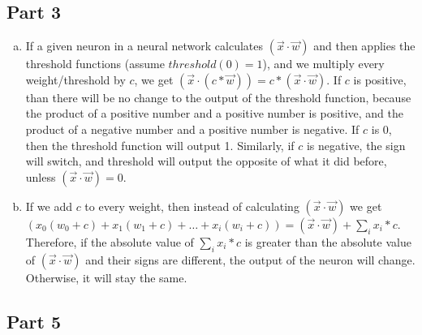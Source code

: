 \documentclass[11pt]{article}
\begin{document}
\subsection*{Part 3}
\begin{enumerate}[a.]
\item If a given neuron in a neural network calculates $(\vec{x} \cdot \vec{w})$ and then applies the threshold functions (assume $threshold(0) =  1$), and we multiply every weight/threshold by $c$, we get  $(\vec{x} \cdot (c * \vec{w})) =  c*(\vec{x} \cdot \vec{w})$. If $c$ is positive, than there will be no change to the output of the threshold function, because the product of a positive number and a positive number is positive, and the product of a negative number and a positive number is negative. If $c$ is 0, then the threshold function will output 1. Similarly, if $c$ is negative, the sign will switch, and threshold will output the opposite of what it did before, unless $(\vec{x} \cdot \vec{w}) = 0$.
\item If we add $c$ to every weight, then instead of calculating $(\vec{x} \cdot \vec{w})$ we get $(x_{0}(w_{0} + c) + x_{1}(w_{1} + c) + \ldots + x_{i}(w_{i} + c)) = (\vec{x} \cdot \vec{w}) + \sum\limits_{i} x_{i}*c$. Therefore, if the absolute value of $\sum\limits_{i} x_{i}*c$ is greater than the absolute value of $(\vec{x} \cdot \vec{w}) $ and their signs are different, the output of the neuron will change. Otherwise, it will stay the same. 
\end{enumerate}

\subsection*{Part 5}
\end{document}
